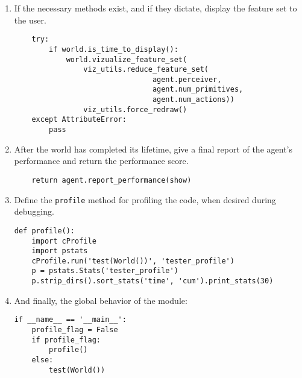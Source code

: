 \begin{enumerate}
\item
If the necessary methods exist, and if they dictate, display the feature set to the user.        
\begin{verbatim}    
    try:
        if world.is_time_to_display():                
            world.vizualize_feature_set(
                viz_utils.reduce_feature_set(
                                agent.perceiver, 
                                agent.num_primitives, 
                                agent.num_actions))
                viz_utils.force_redraw()
    except AttributeError:
        pass
\end{verbatim}

\item
After the world has completed its lifetime, give a final report of the agent's performance and return the performance score.    
\begin{verbatim}    
    return agent.report_performance(show)
\end{verbatim}

\item
Define the \texttt{profile} method for profiling the code, when desired during debugging.
\begin{verbatim}    
def profile():
    import cProfile
    import pstats
    cProfile.run('test(World())', 'tester_profile')
    p = pstats.Stats('tester_profile')
    p.strip_dirs().sort_stats('time', 'cum').print_stats(30)
\end{verbatim}        

\item
And finally, the global behavior of the module:   
\begin{verbatim}        
if __name__ == '__main__':
    profile_flag = False
    if profile_flag:
        profile()
    else:
        test(World())
\end{verbatim}        
\end{enumerate}

